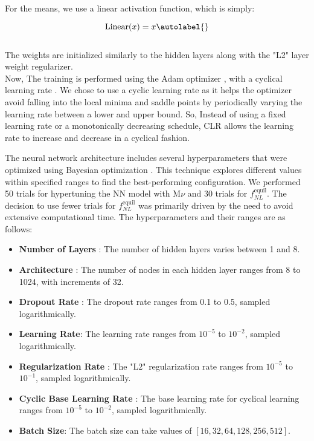 For the means, we use a linear activation function, which is simply:

\begin{equation}
    \text{Linear}(x) = x \autolabel{}
\end{equation}
\\
The weights are initialized similarly to the hidden layers along with the "L2" layer weight regularizer.\\

Now, The training is performed using the Adam optimizer \cite{kingma2017adammethodstochasticoptimization}, with a cyclical learning rate \cite{smith2017cyclicallearningratestraining}. We chose to use a cyclic learning rate as it helps the optimizer avoid falling into the local minima and saddle points by periodically varying the learning rate between a lower and upper bound. So, Instead of using a fixed learning rate or a monotonically decreasing schedule, CLR allows the learning rate to increase and decrease in a cyclical fashion. 

The neural network architecture includes several hyperparameters that were optimized using Bayesian optimization \cite{omalley2019kerastuner}. This technique explores different values within specified ranges to find the best-performing configuration. We performed 50 trials for hypertuning the NN model with $\mathrm{M}{\nu}$ and 30 trials for $f_{NL}^{\mathrm{equil}}$. The decision to use fewer trials for $f_{NL}^{\mathrm{equil}}$ was primarily driven by the need to avoid extensive computational time. The hyperparameters and their ranges are as follows:



\begin{itemize}
    \item \textbf{Number of Layers }: The number of hidden layers varies between 1 and 8.
    \item \textbf{Architecture }: The number of nodes in each hidden layer ranges from 8 to 1024, with increments of 32.
    \item \textbf{Dropout Rate }: The dropout rate ranges from 0.1 to 0.5, sampled logarithmically.
    \item \textbf{Learning Rate}: The learning rate ranges from $10^{-5}$ to $10^{-2}$, sampled logarithmically.
    \item \textbf{Regularization Rate }: The "L2" regularization rate ranges from $10^{-5}$ to $10^{-1}$, sampled logarithmically.
    \item \textbf{Cyclic Base Learning Rate }: The base learning rate for cyclical learning ranges from $10^{-5}$ to $10^{-2}$, sampled logarithmically.
    \item \textbf{Batch Size}: The batch size can take values of $[16, 32, 64, 128, 256, 512]$.

\end{itemize}

